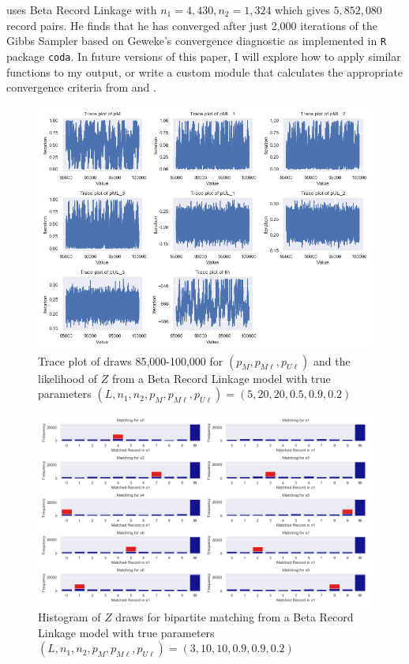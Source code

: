 \documentclass[11pt,reqno]{amsart}
\newcommand\params{(p_M, p_{M\ell}, p_{U\ell})}
\begin{document}
\cite{sadinle_2017} uses Beta Record Linkage with $n_1 = 4,430, n_2 = 1,324$ which gives $5,852,080$ record pairs.  He finds that he has converged after just 2,000 iterations of the Gibbs Sampler based on Geweke's convergence diagnostic as implemented in \texttt{R} package \texttt{coda}.  In future versions of this paper, I will explore how to apply similar functions to my output, or write a custom module that calculates the appropriate convergence criteria from \cite{brooks_gelman_1998} and  \cite{gelman_rubin_1992}.

\begin{figure}[h!]
\begin{center}
\includegraphics[width=\textwidth]{../Figures/bpm/nM10/allTrace_nM10_L3.png}
\caption{Trace plot of draws 85,000-100,000 for $\params$ and the likelihood of $Z$ from a Beta Record Linkage model with true parameters $(L, n_1, n_2, p_M, p_{M\ell}, p_{U\ell}) = (5, 20, 20, 0.5, 0.9, 0.2)$ }
\label{bpmTrace}
\end{center}
\end{figure}


\begin{figure}[h!]
\begin{center}
\includegraphics[width=\textwidth]{../Figures/bpm/nM9/ZmatchesnM9_L3.png}
\caption{Histogram of $Z$ draws for bipartite matching from a Beta Record Linkage model with true parameters $(L, n_1, n_2, p_M, p_{M\ell}, p_{U\ell}) = (3, 10, 10, 0.9, 0.9, 0.2)$ }
\label{Ztrace}
\end{center}
\end{figure}
\end{document}

